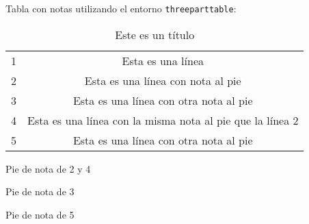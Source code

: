 \documentclass{article}
\begin{document}
Tabla con notas utilizando el entorno \verb|threeparttable|:
\begin{table}[h]
	\centering
	\begin{threeparttable}
		\caption{Este es un título}
		\begin{tabular}{|c|c|}
			\hline
			1	&	Esta es una línea\\ \cline{2-2}
			2	&	Esta es una línea con nota al pie \tnote{1}\\ \cline{2-2}
			3	&	Esta es una línea con otra nota al pie\tnote{2}\\ \cline{2-2}
			4	&	Esta es una línea con la misma nota al pie que la línea 2\tnote{2}\\ \cline{2-2}
			5	&	Esta es una línea con otra nota al pie\tnote{3}\\ \hline
		\end{tabular}
		\footnotesize
		\begin{tablenotes}
			\item[1] Pie de nota de 2 y 4
			\item[2] Pie de nota de 3
			\item[3] Pie de nota de 5
		\end{tablenotes}
	\end{threeparttable}
\end{table}
\end{document}
